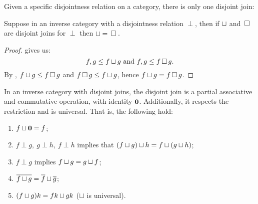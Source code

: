 Given a specific disjointness relation on a category, there is only one disjoint join:
\begin{lemma}\label{lem:disjoint_join_is_unique}
  Suppose \X in an inverse category with a disjointness relation $\perp$, then if  $\sqcup$ and
  $\,\square\,$ are disjoint joins for $\perp$ then $\sqcup = \,\square\,$.
\end{lemma}
\begin{proof}
   gives us:
  \[
    f,g \le f\sqcup g\text{ and }f,g \le f \,\square\, g.
  \]
  By , $f \sqcup g \le f \,\square\, g$ and
  $f \,\square\, g \le f\sqcup g$, hence $f \sqcup g = f \,\square\, g$.
\end{proof}
\begin{lemma}\label{lem:join_is_associative_and_commutative_monoid}
  In an inverse category with disjoint joins, the disjoint join is a partial associative and
  commutative operation, with identity $\mathbf{0}$. Additionally, it respects the restriction and is
  universal. That is, the following hold:
  \begin{enumerate}[{(}i{)}]
    \item $f \sqcup \mathbf{0} = f$; \label{lemitem:identity_for_join}
    \item $f \perp g,\ g\perp h,\ f\perp h$ implies that $(f\sqcup g)\sqcup h = f\sqcup(g\sqcup
      h)$; \label{lemitem:associative_join}
    \item $f \perp g$ implies $f \sqcup g = g \sqcup f$; \label{lemitem:commutative_join}
    \item $\overline{f\sqcup g} = \overline{f} \sqcup \overline{g}$;
    \item $(f \sqcup g)k = f k \sqcup g k$ ($\sqcup$ is universal).
  \end{enumerate}
\end{lemma}
